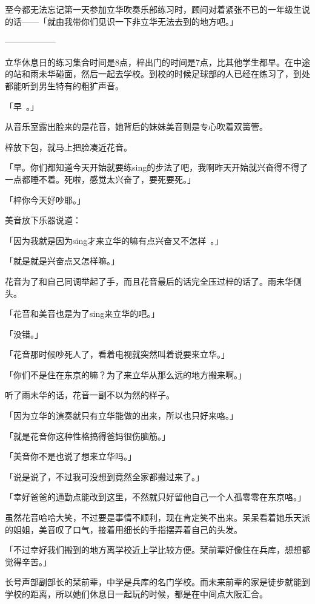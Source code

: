 \documentclass[UTF8]{ctexart}
\begin{document}
    至今都无法忘记第一天参加立华吹奏乐部练习时，顾问对着紧张不已的一年级生说的话——「就由我带你们见识一下非立华无法去到的地方吧。」

    ——————

    立华休息日的练习集合时间是8点，梓出门的时间是7点，比其他学生都早。在中途的站和雨未华碰面，然后一起去学校。到校的时候足球部的人已经在练习了，到处都能听到男生特有的粗犷声音。

    「早~。」

    从音乐室露出脸来的是花音，她背后的妹妹美音则是专心吹着双簧管。

    梓放下包，就马上把脸凑近花音。

    「早。你们都知道今天开始就要练sing的步法了吧，我啊昨天开始就兴奋得不得了一点都睡不着。死啦，感觉太兴奋了，要死要死。」

    「梓你今天好吵耶。」

    美音放下乐器说道：

    「因为我就是因为sing才来立华的嘛有点兴奋又不怎样~。」

    「就是就是兴奋点又怎样嘛。」

    花音为了和自己同调举起了手，而且花音最后的话完全压过梓的话了。雨未华侧头。

    「花音和美音也是为了sing来立华的吧。」

    「没错。」

    「花音那时候吵死人了，看着电视就突然叫着说要来立华。」

    「你们不是住在东京的嘛？为了来立华从那么远的地方搬来啊。」

    听了雨未华的话，花音一副不以为然的样子。

    「因为立华的演奏就只有立华能做的出来，所以也只好来咯。」

    「就是花音你这种性格搞得爸妈很伤脑筋。」

    「美音你不是也说了想来立华吗。」

    「说是说了，不过我可没想到竟然全家都搬过来了。」

    「幸好爸爸的通勤点能改到这里，不然就只好留他自己一个人孤零零在东京咯。」

    虽然花音哈哈大笑，不过要是事情不顺利，现在肯定笑不出来。呆呆看着她乐天派的姐姐，美音叹了口气，接着用细长的手指摆弄着自己的头发。

    「不过幸好我们搬到的地方离学校近上学比较方便。栞前辈好像住在兵库，想想都觉得辛苦。」

    长号声部副部长的栞前辈，中学是兵库的名门学校。而未来前辈的家是徒步就能到学校的距离，所以她们休息日一起玩的时候，都是在中间点大阪汇合。
\end{document}

